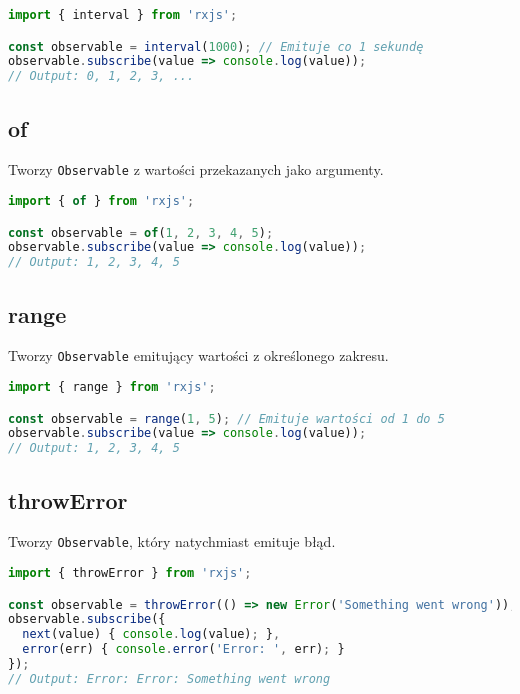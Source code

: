 \documentclass[a4paper,12pt]{article}
\begin{document}
\begin{lstlisting}[language=JavaScript, caption=Przykład użycia \texttt{interval}]
import { interval } from 'rxjs';

const observable = interval(1000); // Emituje co 1 sekundę
observable.subscribe(value => console.log(value));
// Output: 0, 1, 2, 3, ...
\end{lstlisting}

\subsection{of}
Tworzy \texttt{Observable} z wartości przekazanych jako argumenty.

\begin{lstlisting}[language=JavaScript, caption=Przykład użycia \texttt{of}]
import { of } from 'rxjs';

const observable = of(1, 2, 3, 4, 5);
observable.subscribe(value => console.log(value));
// Output: 1, 2, 3, 4, 5
\end{lstlisting}

\subsection{range}
Tworzy \texttt{Observable} emitujący wartości z określonego zakresu.

\begin{lstlisting}[language=JavaScript, caption=Przykład użycia \texttt{range}]
import { range } from 'rxjs';

const observable = range(1, 5); // Emituje wartości od 1 do 5
observable.subscribe(value => console.log(value));
// Output: 1, 2, 3, 4, 5
\end{lstlisting}

\subsection{throwError}
Tworzy \texttt{Observable}, który natychmiast emituje błąd.

\begin{lstlisting}[language=JavaScript, caption=Przykład użycia \texttt{throwError}]
import { throwError } from 'rxjs';

const observable = throwError(() => new Error('Something went wrong'));
observable.subscribe({
  next(value) { console.log(value); },
  error(err) { console.error('Error: ', err); }
});
// Output: Error: Error: Something went wrong
\end{lstlisting}
\end{document}
